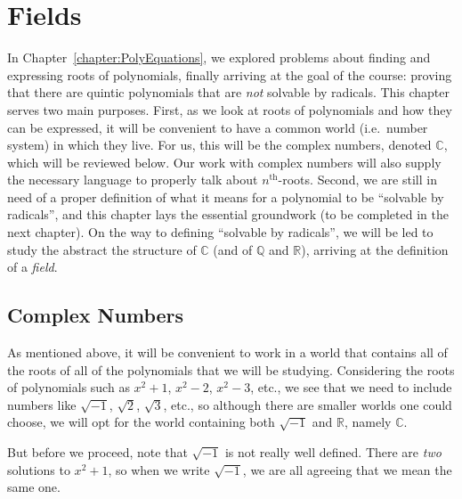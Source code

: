 \chapter{Fields}
\label{chapter:Fields}
\thispagestyle{empty}


In Chapter~\ref{chapter:PolyEquations}, we explored problems about finding and expressing roots of polynomials, finally arriving at the goal of the course: proving that there are quintic polynomials that are \emph{not} solvable by radicals. This chapter serves two main purposes. First, as we look at roots of polynomials and how they can be expressed, it will be convenient to have a common world (i.e.~number system) in which they live. For us, this will be the complex numbers, denoted $\mathbb{C}$, which will be reviewed below. Our work with complex numbers will also supply the necessary language to properly talk about $n^{\text{th}}$-roots. Second, we are still in need of a proper definition of what it means for a polynomial to be ``solvable by radicals'', and this chapter lays the essential groundwork (to be completed in the next chapter). On the way to defining ``solvable by radicals'', we will be led to study the abstract the structure of $\mathbb{C}$ (and of $\mathbb{Q}$ and $\mathbb{R}$), arriving at the definition of a \emph{field}. 

\section{Complex Numbers}
As mentioned above, it will be convenient to work in a world that contains all of the roots of all of the polynomials that we will be studying. Considering the roots of polynomials such as $x^2 +1$, $x^2-2$, $x^2-3$, etc., we see that we need to include numbers like $\sqrt{-1}$, $\sqrt{2}$, $\sqrt{3}$, etc., so although there are smaller worlds one could choose, we will opt for the world containing both $\sqrt{-1}$ and $\mathbb{R}$, namely $\mathbb{C}$.

But before we proceed, note that $\sqrt{-1}$ is not really well defined. There are \emph{two} solutions to $x^2 +1$, so when we write $\sqrt{-1}$, we are all agreeing that we mean the same one. 

